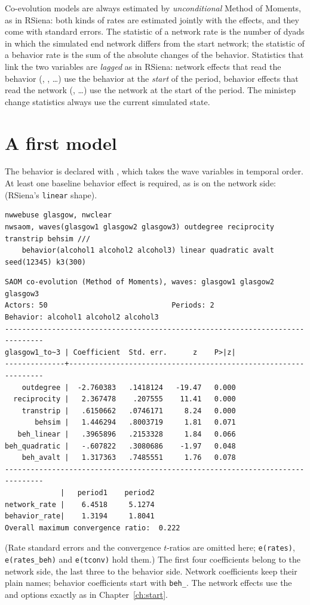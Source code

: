 Co-evolution models are always estimated by \emph{unconditional} Method of Moments, as in RSiena: both kinds of rates are estimated jointly with the effects, and they come with standard errors. The statistic of a network rate is the number of dyads in which the simulated end network differs from the start network; the statistic of a behavior rate is the sum of the absolute changes of the behavior. Statistics that link the two variables are \emph{lagged} as in RSiena: network effects that read the behavior (, , \dots) use the behavior at the \emph{start} of the period, behavior effects that read the network (, \dots) use the network at the start of the period. The ministep change statistics always use the current simulated state.

\section{A first model}

The behavior is declared with , which takes the wave variables in temporal order. At least one baseline behavior effect is required, as  is on the network side:  (RSiena's \texttt{linear} shape).

\begin{lstlisting}
nwwebuse glasgow, nwclear
nwsaom, waves(glasgow1 glasgow2 glasgow3) outdegree reciprocity transtrip behsim ///
    behavior(alcohol1 alcohol2 alcohol3) linear quadratic avalt seed(12345) k3(300)
\end{lstlisting}
\begin{lstlisting}
SAOM co-evolution (Method of Moments), waves: glasgow1 glasgow2 glasgow3
Actors: 50                             Periods: 2
Behavior: alcohol1 alcohol2 alcohol3
-------------------------------------------------------------------------------
glasgow1_to~3 | Coefficient  Std. err.      z    P>|z|
--------------+----------------------------------------------------------------
    outdegree |  -2.760383   .1418124   -19.47   0.000
  reciprocity |   2.367478    .207555    11.41   0.000
    transtrip |   .6150662   .0746171     8.24   0.000
       behsim |   1.446294   .8003719     1.81   0.071
   beh_linear |   .3965896   .2153328     1.84   0.066
beh_quadratic |   -.607822   .3080686    -1.97   0.048
    beh_avalt |   1.317363   .7485551     1.76   0.078
-------------------------------------------------------------------------------
             |   period1    period2
network_rate |    6.4518     5.1274
behavior_rate|    1.3194     1.8041
Overall maximum convergence ratio:  0.222
\end{lstlisting}
(Rate standard errors and the convergence $t$-ratios are omitted here; \texttt{e(rates)}, \texttt{e(rates\_beh)} and \texttt{e(tconv)} hold them.) The first four coefficients belong to the network side, the last three to the behavior side. Network coefficients keep their plain names; behavior coefficients start with \texttt{beh\_}. The network effects use the  and  options exactly as in Chapter~\ref{ch:start}.

